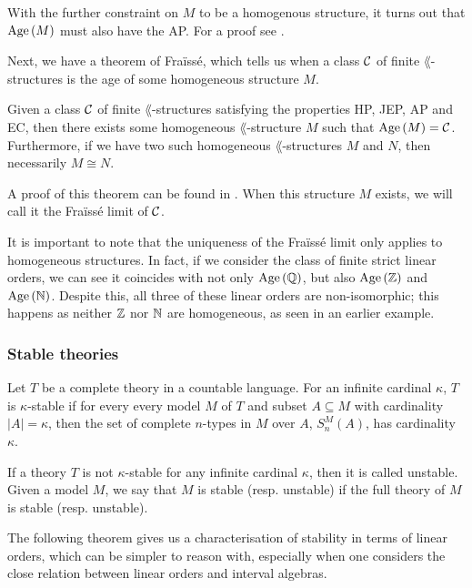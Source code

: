 \documentclass[../main.tex]{subfiles}
\begin{document}
With the further constraint on $M$ to be a homogenous structure, it turns out that $\text{Age}\left(M\right)$ must
also have the AP. For a proof see \cite{hodges93}.


Next, we have a theorem of Fraïssé, which tells us when a class $\mathcal{C}$ of finite $\lang$-structures is
the age of some homogeneous structure $M$.

\begin{thm}
  Given a class $\mathcal{C}$ of finite $\lang$-structures satisfying the properties HP, JEP, AP and EC, then
  there exists some homogeneous $\lang$-structure $M$ such that $\text{Age}\left(M\right) = \mathcal{C}$. Furthermore, if we
  have two such homogeneous $\lang$-structures $M$ and $N$, then necessarily $M \cong N$.
\end{thm}

A proof of this theorem can be found in \cite{hodges93}. When this structure $M$ exists, we will
call it the Fraïssé limit of $\mathcal{C}$.

It is important to note that the uniqueness of the Fraïssé limit only applies to homogeneous
structures. In fact, if we consider the class of finite strict linear orders, we can see it
coincides with not only $\text{Age}\left(\mathbb{Q}\right)$, but also $\text{Age}\left(\mathbb{Z}\right)$ and $\text{Age}\left(\mathbb{N}\right)$. Despite this, all three
of these linear orders are non-isomorphic; this happens as neither $\mathbb{Z}$ nor $\mathbb{N}$ are homogeneous,
as seen in an earlier example.

\subsubsection{Stable theories}%
\label{ssub:stable_theories}

\begin{defn}
  Let $T$ be a complete theory in a countable language. For an infinite cardinal $\kappa$, $T$ is
  $\kappa$-stable if for every every model $M$ of $T$ and subset $A \subseteq M$ with cardinality
  $|A| = \kappa$, then the set of complete $n$-types in $M$ over $A$,  $S_n^M(A)$, has cardinality
  $\kappa$.
\end{defn}

If a theory $T$ is not $\kappa$-stable for any infinite cardinal $\kappa$, then it is called
unstable. Given a model $M$, we say that $M$ is stable (resp. unstable) if the full theory of $M$
is stable (resp. unstable).

The following theorem gives us a characterisation of stability in terms of linear orders, which can
be simpler to reason with, especially when one considers the close relation between linear orders
and interval algebras.
\end{document}

